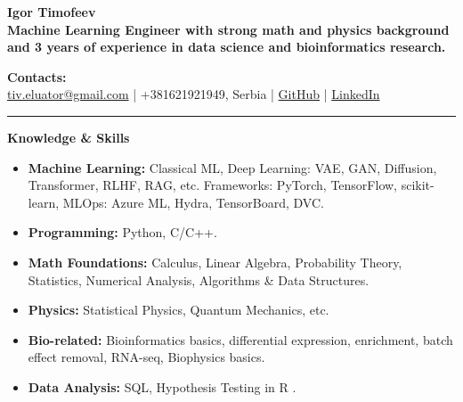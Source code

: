 \documentclass[12pt]{article}
\begin{document}
\begin{center}
    {\Huge \textbf{Igor Timofeev}}\\[6pt]
    \textbf{Machine Learning Engineer with strong math and physics background and 3 years of experience in data science and bioinformatics research.}\\
\end{center}

\vspace{1em}

\noindent\textbf{Contacts:}\\
\href{mailto:tiv.eluator@gmail.com}{tiv.eluator@gmail.com} \quad | \quad
+381621921949, Serbia \quad | \quad
\href{https://github.com/eluator}{GitHub} \quad | \quad
\href{https://www.linkedin.com/in/itimofeev}{LinkedIn}

\vspace{1em}
\hrule
\vspace{1em}

\noindent \textbf{\Large Knowledge \& Skills}
\begin{itemize}
    \item \textbf{Machine Learning:} Classical ML, Deep Learning: VAE, GAN, Diffusion, Transformer, RLHF, RAG, etc. Frameworks: PyTorch, TensorFlow, scikit-learn, MLOps: Azure ML, Hydra, TensorBoard, DVC.
    \item \textbf{Programming:} Python, C/C++.
    \item \textbf{Math Foundations:} Calculus, Linear Algebra, Probability Theory, Statistics, Numerical Analysis, Algorithms \& Data Structures.
    \item \textbf{Physics:} Statistical Physics, Quantum Mechanics, etc.
    \item \textbf{Bio-related:} Bioinformatics basics, differential expression, enrichment, batch effect removal, RNA-seq, Biophysics basics.
    \item \textbf{Data Analysis:} SQL, Hypothesis Testing in R \href{https://github.com/eluator/DataAnalysisInR}{\faGithub}.
\end{itemize}

\vspace{1em}
\end{document}
